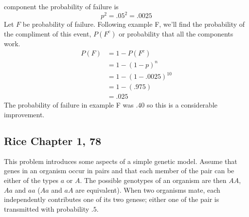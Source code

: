 \documentclass{tufte-book}
\theoremstyle{mytheoremstyle}
\theoremstyle{mylemstyle}
\theoremstyle{mydefstyle}
\begin{document}
 component the probability of failure is
\[ p^2=.05^2=.0025 \]
Let $F$ be probability of failure. Following example F, we'll find the probability of the compliment of this event, $P(F^c)$ or probability that all the components work.
\begin{align}
P(F) &= 1 - P(F^c) \\
&= 1 - (1-p)^n \\
&= 1 - (1-.0025)^{10} \\
&= 1 - (.975) \\
&= .025
\end{align}
The probability of failure in example F was $.40$ so this is a considerable improvement.


\subsection{Rice Chapter 1, 78}
This problem introduces some aspects of a simple genetic model.  Assume that genes in an organism occur in pairs and that each member of the pair can be either of the types $a$ or $A$.  The possible genotypes of an organism are then $AA$, $Aa$ and $aa$ ($Aa$ and $aA$ are equivalent).  When two organisms mate, each independently contributes one of its two genese; either one of the pair is transmitted with probability $.5$.
\end{document}
